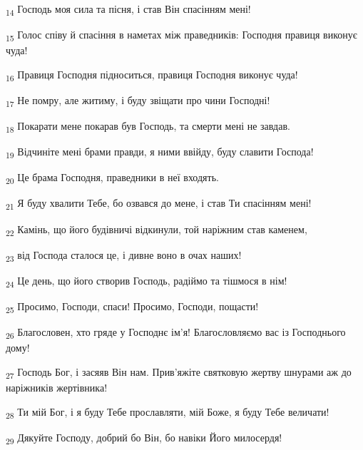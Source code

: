 \begin{tcolorbox}
\textsubscript{14} Господь моя сила та пісня, і став Він спасінням мені!
\end{tcolorbox}
\begin{tcolorbox}
\textsubscript{15} Голос співу й спасіння в наметах між праведників: Господня правиця виконує чуда!
\end{tcolorbox}
\begin{tcolorbox}
\textsubscript{16} Правиця Господня підноситься, правиця Господня виконує чуда!
\end{tcolorbox}
\begin{tcolorbox}
\textsubscript{17} Не помру, але житиму, і буду звіщати про чини Господні!
\end{tcolorbox}
\begin{tcolorbox}
\textsubscript{18} Покарати мене покарав був Господь, та смерти мені не завдав.
\end{tcolorbox}
\begin{tcolorbox}
\textsubscript{19} Відчиніте мені брами правди, я ними ввійду, буду славити Господа!
\end{tcolorbox}
\begin{tcolorbox}
\textsubscript{20} Це брама Господня, праведники в неї входять.
\end{tcolorbox}
\begin{tcolorbox}
\textsubscript{21} Я буду хвалити Тебе, бо озвався до мене, і став Ти спасінням мені!
\end{tcolorbox}
\begin{tcolorbox}
\textsubscript{22} Камінь, що його будівничі відкинули, той наріжним став каменем,
\end{tcolorbox}
\begin{tcolorbox}
\textsubscript{23} від Господа сталося це, і дивне воно в очах наших!
\end{tcolorbox}
\begin{tcolorbox}
\textsubscript{24} Це день, що його створив Господь, радіймо та тішмося в нім!
\end{tcolorbox}
\begin{tcolorbox}
\textsubscript{25} Просимо, Господи, спаси! Просимо, Господи, пощасти!
\end{tcolorbox}
\begin{tcolorbox}
\textsubscript{26} Благословен, хто гряде у Господнє ім'я! Благословляємо вас із Господнього дому!
\end{tcolorbox}
\begin{tcolorbox}
\textsubscript{27} Господь Бог, і засяяв Він нам. Прив'яжіте святковую жертву шнурами аж до наріжників жертівника!
\end{tcolorbox}
\begin{tcolorbox}
\textsubscript{28} Ти мій Бог, і я буду Тебе прославляти, мій Боже, я буду Тебе величати!
\end{tcolorbox}
\begin{tcolorbox}
\textsubscript{29} Дякуйте Господу, добрий бо Він, бо навіки Його милосердя!
\end{tcolorbox}

